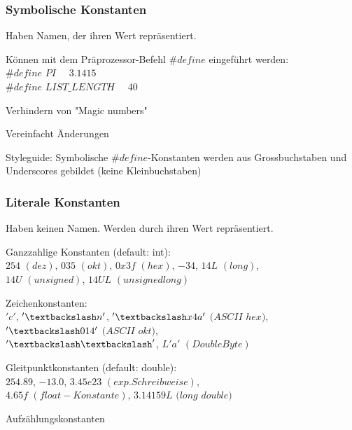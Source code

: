 	 		\begin{minipage}[t]{8 cm}
		 		\subsubsection{Symbolische Konstanten}
		 			Haben Namen, der ihren Wert repräsentiert.
		 			\begin{compactitem}
		 				\item Können mit dem Präprozessor-Befehl $\#define$ eingeführt werden:\\
		 				$\#define$ $PI$ \ \ $3.1415$\\
		 				$\#define$ $LIST\_LENGTH$ \ \ $40$
		 				\item Verhindern von "Magic numbers"
		 				\item Vereinfacht Änderungen
		 				\item Styleguide: Symbolische $\#define$-Konstanten werden aus Grossbuchstaben und Underscores gebildet (keine Kleinbuchstaben) 			 	
		 			\end{compactitem}
		 	\end{minipage}
		 	\hspace*{1.0 cm}
		 	\begin{minipage}[t]{9 cm}
 				\subsubsection{Literale Konstanten}
 					Haben keinen Namen. Werden durch ihren Wert repräsentiert.
 					\begin{compactitem}
	 					\item Ganzzahlige Konstanten (default: int):\\
	 					$254$ $(dez)$, $035$ $(okt)$, $0x3f$ $(hex)$, $-34$, $14L$ $(long)$,\\ $14U$ $(unsigned)$, $14UL$ $(unsigned long)$
	 					\item Zeichenkonstanten:\\
	 					$'c'$, $'\textbackslash n'$, $'\textbackslash x4a'$ $(ASCII$ $hex)$, $'\textbackslash014'$ $(ASCII$ $okt)$, \\$'\textbackslash \textbackslash'$, $L'a'$ $(Double Byte)$
	 					\item Gleitpunktkonstanten (default: double):\\
	 					$254.89$, $-13.0$, $3.45e23$ $(exp. Schreibweise)$, \\ $4.65f$ $(float-Konstante)$,  $3.14159L$ $(long$ $double)$
	 					\item Aufzählungskonstanten		 				 			 	
 					\end{compactitem}
 			\end{minipage}
